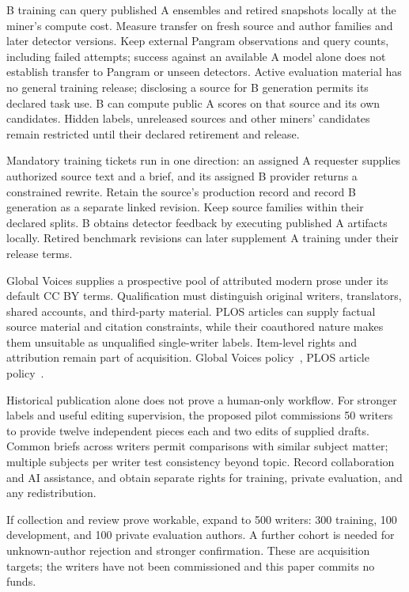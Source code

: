 B training can query published A ensembles and retired snapshots locally
at the miner's compute cost. Measure transfer on fresh source and author
families and later detector versions. Keep external Pangram observations
and query counts, including failed attempts; success against an available
A model alone does not establish transfer to Pangram or unseen detectors.
Active evaluation material has no general training release; disclosing a
source for B generation permits its declared task use. B can compute public
A scores on that source and its own candidates. Hidden labels, unreleased
sources and other miners' candidates remain restricted until their declared
retirement and release.

Mandatory training tickets run in one direction: an assigned A requester
supplies authorized source text and a brief, and its assigned B provider
returns a constrained rewrite. Retain the source's production record and
record B generation as a separate linked revision. Keep source families
within their declared splits. B obtains detector
feedback by executing published A artifacts locally. Retired benchmark
revisions can later supplement A training under their release terms.

Global Voices supplies a prospective pool of attributed modern prose
under its default CC BY terms. Qualification must distinguish original
writers, translators, shared accounts, and third-party material. PLOS
articles can supply factual source material and citation constraints,
while their coauthored nature makes them unsuitable as unqualified
single-writer labels. Item-level rights and attribution remain part of
acquisition.
Global Voices policy~\cite{globalvoices},
PLOS article policy~\cite{plos}.

Historical publication alone does not prove a human-only workflow. For
stronger labels and useful editing supervision, the proposed pilot
commissions 50 writers to provide twelve independent pieces each and two
edits of supplied drafts. Common briefs across writers permit
comparisons with similar subject matter; multiple subjects per writer
test consistency beyond topic. Record collaboration and AI assistance,
and obtain separate rights for training, private evaluation, and any
redistribution.

If collection and review prove workable, expand to 500 writers: 300
training, 100 development, and 100 private evaluation authors. A further
cohort is needed for unknown-author rejection and stronger confirmation.
These are acquisition targets; the writers have not been commissioned
and this paper commits no funds.

